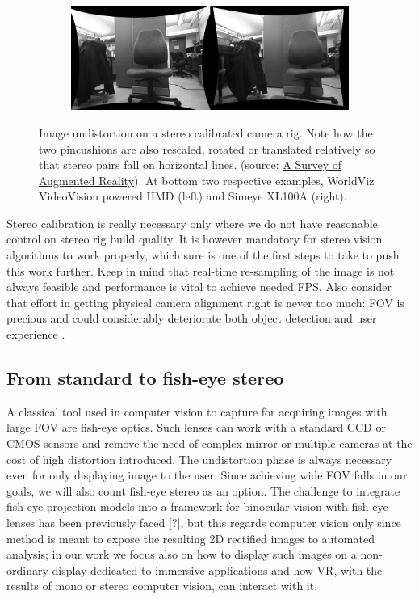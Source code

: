 \begin{figure}
\begin{subfigure}{0.49\textwidth}
\end{subfigure}
\begin{subfigure}{0.49\textwidth}
\includegraphics[width=\linewidth]{pictures/stereo-undistorted}
\end{subfigure}
\caption{Image undistortion on a stereo calibrated camera rig. Note how the two pincushions are also rescaled, rotated or translated relatively so that stereo pairs fall on horizontal lines. (source: \href{http://www.cs.unc.edu/~azuma/ARpresence.pdf}{A Survey of Augmented Reality}). At bottom two respective examples, WorldViz VideoVision powered HMD (left) and Simeye XL100A (right).}
\label{fig:stereo_undistort}
\end{figure}

Stereo calibration is really necessary only where we do not have reasonable control on stereo rig build quality. It is however mandatory for stereo vision algorithms to work properly, which sure is one of the first steps to take to push this work further. Keep in mind that real-time re-sampling of the image is not always feasible and performance is vital to achieve needed FPS. Also consider that effort in getting physical camera alignment right is never too much: FOV is precious and could considerably deteriorate both object detection and user experience \cite{restricting_FOV}.

\subsection{From standard to fish-eye stereo}
A classical tool used in computer vision to capture for acquiring images with large FOV are fish-eye optics. Such lenses can work with a standard CCD or CMOS sensors and remove the need of complex mirror or multiple cameras at the cost of high distortion introduced. The undistortion phase is always necessary even for only displaying image to the user. Since achieving wide FOV falls in our goals, we will also count fish-eye stereo as an option. The challenge to integrate fish-eye projection models into a framework for binocular vision with fish-eye lenses has been previously faced [?], but this regards computer vision only since method is meant to expose the resulting 2D rectified images to automated analysis; in our work we focus also on how to display such images on a non-ordinary display dedicated to immersive applications and how VR, with the results of mono or stereo computer vision, can interact with it.

